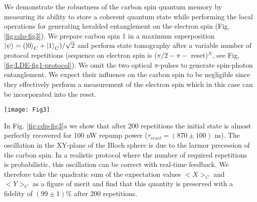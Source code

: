  We demonstrate the robustness of the carbon spin quantum memory by measuring its ability to store a coherent quantum state while performing the local operations for generating heralded entanglement on the electron spin (Fig. \ref{fig:cdp-fig3}). We prepare carbon spin 1 in a maximum superposition $\left|\psi\right>=(\left|0\right>_C + \left|1\right>_C)/\sqrt{2}$ and perform state tomography after a variable number of protocol repetitions (sequence on electron spin is ($\pi/2 - \pi -$ reset)$^N$, see Fig. \ref{fig:LDE-fig1-protocol}). We omit the two optical $\pi$-pulses to generate spin-photon entanglement. We expect their influence on the carbon spin to be negligible since they effectively perform a measurement of the electron spin which in this case can be incorporated into the reset.
 \begin{figure*}
	\centering
	\texttt{[image: Fig3]}
	\caption{\label{fig:cdp-fig3} \textbf{Coherence of the carbon spin upon optical excitation of the electron.} (a) Tomography of carbon spin 1 initially prepared in a superposition as a function of number of repetitions of the heralded entanglement protocol. The repumping pulse is applied for 20 $\mu$s with a power of 100 nW, the time before and after the microwave $pi$-pulse is 200 ns. (b) Dephasing of the carbon spin for different repumping powers, with the same repump time and interpulse delay as in (a). Inset: the decay constants obtained from a fit to the data in (b) as a function of $\tau_{reset}$ for that laser power. }
\end{figure*}

In Fig. \ref{fig:cdp-fig3}a we show that after 200 repetitions the initial state is almost perfectly recovered for 100 nW repump power ($\tau_{reset} = (870 \pm 100)$ ns). The oscillation in the XY-plane of the Bloch sphere is due to the larmor precession of the carbon spin. In a realistic protocol where the number of required repetitions is probabilistic, this oscillation can be correct with real-time feedback. We therefore take the quadratic sum of the expectation values $<X>_C$ and $<Y>_C$ as a figure of merit and find that this quantity is preserved with a fidelity of $(99 \pm 1) \%$ after 200 repetitions.

